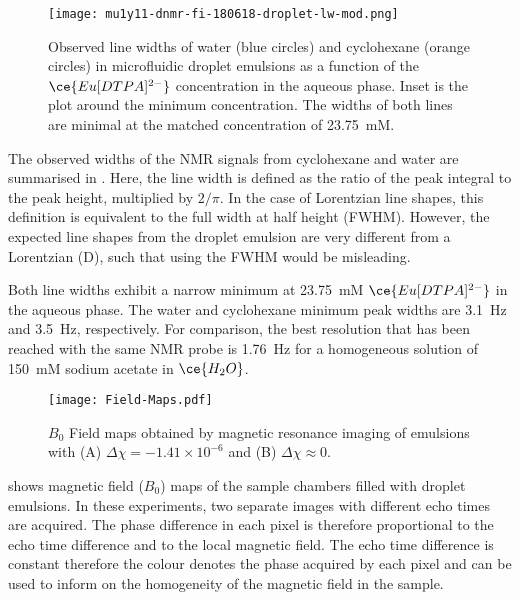 \begin{figure}[ht]
  \begin{center}
    \texttt{[image: mu1y11-dnmr-fi-180618-droplet-lw-mod.png]}
  \end{center}
  \caption{Observed line widths of water (blue circles) and
    cyclohexane (orange circles) in microfluidic droplet emulsions
    as a function of the $\ce{Eu[DTPA]^{2-}}$ concentration in the aqueous phase. Inset is the plot around the minimum
    concentration.
    The widths of both lines are minimal
    at the matched concentration of 23.75~mM. }
    \label{fig:line widths}
\end{figure}


The observed widths of the NMR signals from cyclohexane and water
are summarised in . Here, the line width is defined as
the ratio of the peak integral to the peak height, multiplied by $2/\pi$. In the
case of Lorentzian line shapes, this definition is equivalent to the full width at half height
(FWHM). However, the expected line shapes from the droplet emulsion are very different
from a Lorentzian (D), such that using the FWHM would be misleading.

Both line widths exhibit a narrow
minimum at 23.75~mM $\ce{Eu[DTPA]^{2-}}$ in the aqueous phase. The water and
cyclohexane minimum peak widths are 3.1~Hz and 3.5~Hz, respectively. For comparison, the best resolution
that has been reached with the same NMR probe is 1.76~Hz for a homogeneous
solution of 150~mM sodium acetate in $\ce{H_2O}$.\citep{Finch:2016gv}

\begin{figure}
  \begin{center}
    \texttt{[image: Field-Maps.pdf]}
  \end{center}
  \caption{$B_0$ Field maps obtained by magnetic resonance imaging of emulsions
  with (A) $\Delta\chi=-1.41\times 10^{-6}$ and (B) $\Delta\chi\approx 0$.
  }
  \label{fig:field-map}
\end{figure}

 shows magnetic field ($B_0$) maps of the sample chambers filled
with droplet emulsions.
In these experiments, two separate
images with different echo times are acquired. The phase difference in each pixel is therefore
proportional to the echo time difference and to the local magnetic field. The echo time difference is constant
therefore the colour denotes the phase acquired by each pixel and can be used to
inform on the homogeneity of the magnetic field in the sample.

